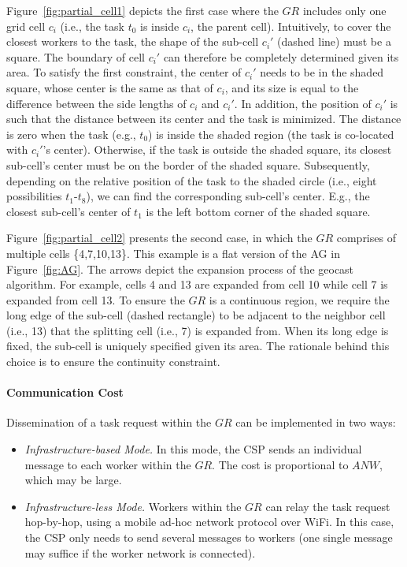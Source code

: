 \documentclass{USC-Thesis}
\numberwithin{equation}{chapter}
\begin{document}
Figure~\ref{fig:partial_cell1} depicts the first case where the $\mathit{GR}$ includes only one grid cell $c_i$ (i.e., the task $t_0$ is inside $c_i$, the parent cell). Intuitively, to cover the closest workers to the task, the shape of the sub-cell $c_i'$ (dashed line) must be a square. The boundary of cell $c_i'$ can therefore be completely determined given its area. To satisfy the first constraint, the center of $c_i'$ needs to be in the shaded square, whose center is the same as that of $c_i$, and its size is equal to the difference between the side lengths of $c_i$ and $c_i'$. In addition, the position of $c_i'$ is such that the distance between its center and the task is minimized.
The distance is zero when the task (e.g., $t_0$) is inside the shaded region (the task is co-located with $c_i'$'s center).
Otherwise, if the task is outside the shaded square, its closest sub-cell's center must be on the border of the shaded square. Subsequently, depending on the relative position of the task to the shaded circle (i.e., eight possibilities $t_1$-$t_8$), we can find the corresponding sub-cell's center. E.g., the closest sub-cell's center of $t_1$ is the left bottom corner of the shaded square.%

Figure~\ref{fig:partial_cell2} presents the second case, in which the $\mathit{GR}$ comprises of multiple cells \{4,7,10,13\}. This example is a flat version of the AG in Figure~\ref{fig:AG}. The arrows depict the expansion process of the geocast algorithm. For example, cells 4 and 13 are expanded from cell 10 while cell 7 is expanded from cell 13. To ensure the $\mathit{GR}$ is a continuous region, we require the long edge of the sub-cell (dashed rectangle) to be adjacent to the neighbor cell (i.e., 13) that the splitting cell (i.e., 7) is expanded from. When its long edge is fixed, the sub-cell is uniquely specified given its area. The rationale behind this choice is to ensure the continuity constraint. 

\paragraph{Communication Cost}
\label{sec:shape}
Dissemination of a task request within the $\mathit{GR}$ can be implemented in two ways:
\begin{itemize}
\item
{\em Infrastructure-based Mode.} In this mode, the CSP sends an individual message to each worker within the $\mathit{GR}$. The cost is proportional to $\mathit{ANW}$, which may be large.
\item
{\em Infrastructure-less Mode.} Workers within the $\mathit{GR}$ can relay the task request hop-by-hop, using a mobile ad-hoc network protocol over WiFi. In this case, the CSP only needs to send several messages to workers (one single message may suffice if the worker network is connected).  
\end{itemize}
\end{document}

